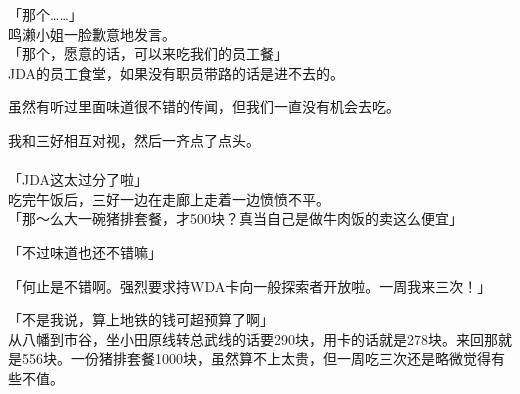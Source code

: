 「那个……」\\

鸣濑小姐一脸歉意地发言。\\

「那个，愿意的话，可以来吃我们的员工餐」\\

JDA的员工食堂，如果没有职员带路的话是进不去的。

虽然有听过里面味道很不错的传闻，但我们一直没有机会去吃。

我和三好相互对视，然后一齐点了点头。\\

\sqsplit\\

「JDA这太过分了啦」\\

吃完午饭后，三好一边在走廊上走着一边愤愤不平。\\

「那～么大一碗猪排套餐，才500块？真当自己是做牛肉饭的卖这么便宜」

「不过味道也还不错嘛」

「何止是不错啊。强烈要求持WDA卡向一般探索者开放啦。一周我来三次！」

「不是我说，算上地铁的钱可超预算了啊」\\

从八幡到市谷，坐小田原线转总武线的话要290块，用卡的话就是278块。来回那就是556块。一份猪排套餐1000块，虽然算不上太贵，但一周吃三次还是略微觉得有些不值。\\

